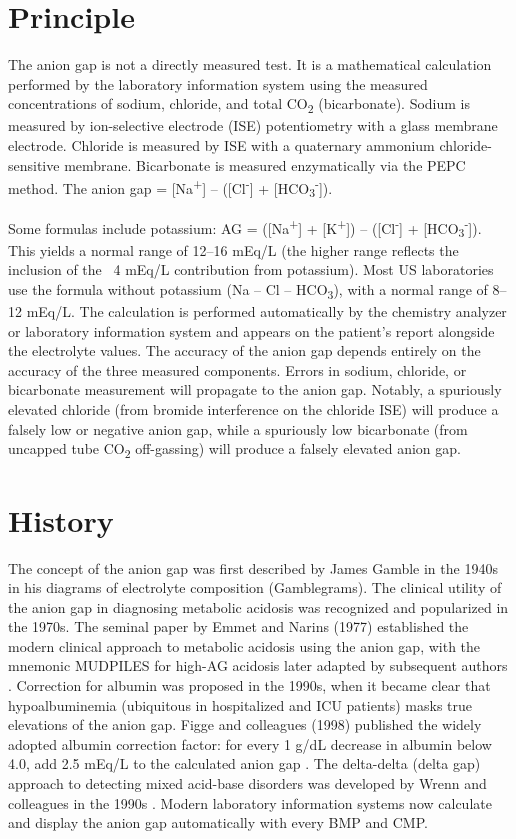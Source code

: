 \section*{Principle}
The anion gap is not a directly measured test. It is a mathematical calculation performed by the laboratory information system using the measured concentrations of sodium, chloride, and total CO\textsubscript{2} (bicarbonate). Sodium is measured by ion-selective electrode (ISE) potentiometry with a glass membrane electrode. Chloride is measured by ISE with a quaternary ammonium chloride-sensitive membrane. Bicarbonate is measured enzymatically via the PEPC method. The anion gap = [Na\textsuperscript{+}] -- ([Cl\textsuperscript{-}] + [HCO\textsubscript{3}\textsuperscript{-}]).

Some formulas include potassium: AG = ([Na\textsuperscript{+}] + [K\textsuperscript{+}]) -- ([Cl\textsuperscript{-}] + [HCO\textsubscript{3}\textsuperscript{-}]). This yields a normal range of 12--16 mEq/L (the higher range reflects the inclusion of the ~4 mEq/L contribution from potassium). Most US laboratories use the formula without potassium (Na -- Cl -- HCO\textsubscript{3}), with a normal range of 8--12 mEq/L. The calculation is performed automatically by the chemistry analyzer or laboratory information system and appears on the patient's report alongside the electrolyte values. The accuracy of the anion gap depends entirely on the accuracy of the three measured components. Errors in sodium, chloride, or bicarbonate measurement will propagate to the anion gap. Notably, a spuriously elevated chloride (from bromide interference on the chloride ISE) will produce a falsely low or negative anion gap, while a spuriously low bicarbonate (from uncapped tube CO\textsubscript{2} off-gassing) will produce a falsely elevated anion gap.

\section*{History}
The concept of the anion gap was first described by James Gamble in the 1940s in his diagrams of electrolyte composition (Gamblegrams). The clinical utility of the anion gap in diagnosing metabolic acidosis was recognized and popularized in the 1970s. The seminal paper by Emmet and Narins (1977) established the modern clinical approach to metabolic acidosis using the anion gap, with the mnemonic MUDPILES for high-AG acidosis later adapted by subsequent authors \cite{emmett1977clinical}. Correction for albumin was proposed in the 1990s, when it became clear that hypoalbuminemia (ubiquitous in hospitalized and ICU patients) masks true elevations of the anion gap. Figge and colleagues (1998) published the widely adopted albumin correction factor: for every 1 g/dL decrease in albumin below 4.0, add 2.5 mEq/L to the calculated anion gap \cite{figge1998anion}. The delta-delta (delta gap) approach to detecting mixed acid-base disorders was developed by Wrenn and colleagues in the 1990s \cite{wrenn1990delta}. Modern laboratory information systems now calculate and display the anion gap automatically with every BMP and CMP.

